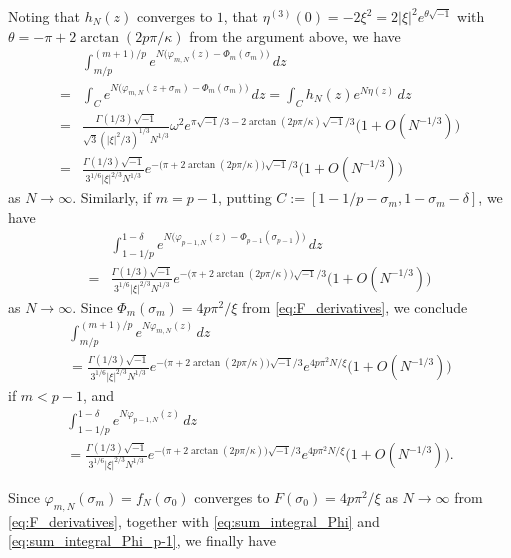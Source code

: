 \documentclass[a4paper,dvipdfmx]{amsart}
\theoremstyle{plain}
\theoremstyle{definition}
\theoremstyle{remark}
\renewcommand{\i}{\sqrt{-1}}
\newcommand{\saddle}{\sigma}
\numberwithin{equation}{section}
\begin{document}
Noting that $h_N(z)$ converges to $1$, that $\eta^{(3)}(0)=-2\xi^2=2|\xi|^2e^{\theta\i}$ with $\theta=-\pi+2\arctan(2p\pi/\kappa)$ from the argument above, we have
\begin{equation*}
\begin{split}
  &\int_{m/p}^{(m+1)/p}
  e^{N\bigl(\varphi_{m,N}(z)-\Phi_{m}(\saddle_m)\bigr)}\,dz
  \\
  =&
  \int_{C}
  e^{N\bigl(\varphi_{m,N}(z+\saddle_m)-\Phi_{m}(\saddle_m)\bigr)}\,dz
  =
  \int_{C}
  h_N(z)e^{N\eta(z)}\,dz
  \\
  =&
  \frac{\Gamma(1/3)\i}{\sqrt{3}(|\xi|^2/3)^{1/3}N^{1/3}}
  \omega^2e^{\pi\i/3-2\arctan(2p\pi/\kappa)\i/3}
  \bigl(1+O(N^{-1/3})\bigr)
  \\
  =&
  \frac{\Gamma(1/3)\i}{3^{1/6}|\xi|^{2/3}N^{1/3}}
  e^{-\bigl(\pi+2\arctan(2p\pi/\kappa)\bigr)\i/3}
  \bigl(1+O(N^{-1/3})\bigr)
\end{split}
\end{equation*}
as $N\to\infty$.
Similarly, if $m=p-1$, putting $C:=[1-1/p-\saddle_m,1-\saddle_m-\delta]$, we have
\begin{equation*}
\begin{split}
  &\int_{1-1/p}^{1-\delta}
  e^{N\bigl(\varphi_{p-1,N}(z)-\Phi_{p-1}(\saddle_{p-1})\bigr)}\,dz
  \\
  =&
  \frac{\Gamma(1/3)\i}{3^{1/6}|\xi|^{2/3}N^{1/3}}
  e^{-\bigl(\pi+2\arctan(2p\pi/\kappa)\bigr)\i/3}
  \bigl(1+O(N^{-1/3})\bigr)
\end{split}
\end{equation*}
as $N\to\infty$.
Since $\Phi_m(\saddle_m)=4p\pi^2/\xi$ from \eqref{eq:F_derivatives}, we conclude
\begin{multline*}
  \int_{m/p}^{(m+1)/p}
  e^{N\varphi_{m,N}(z)}\,dz
  \\
  =
  \frac{\Gamma(1/3)\i}{3^{1/6}|\xi|^{2/3}N^{1/3}}
  e^{-\bigl(\pi+2\arctan(2p\pi/\kappa)\bigr)\i/3}
  e^{4p\pi^2N/\xi}
  \bigl(1+O(N^{-1/3})\bigr)
\end{multline*}
if $m<p-1$, and
\begin{multline*}
  \int_{1-1/p}^{1-\delta}
  e^{N\varphi_{p-1,N}(z)}\,dz
  \\
  =
  \frac{\Gamma(1/3)\i}{3^{1/6}|\xi|^{2/3}N^{1/3}}
  e^{-\bigl(\pi+2\arctan(2p\pi/\kappa)\bigr)\i/3}
  e^{4p\pi^2N/\xi}
  \bigl(1+O(N^{-1/3})\bigr).
\end{multline*}
\par
Since $\varphi_{m,N}(\saddle_m)=f_N(\saddle_0)$ converges to $F(\saddle_0)=4p\pi^2/\xi$ as $N\to\infty$ from \eqref{eq:F_derivatives}, together with \eqref{eq:sum_integral_Phi} and \eqref{eq:sum_integral_Phi_p-1}, we finally have
\end{document}
